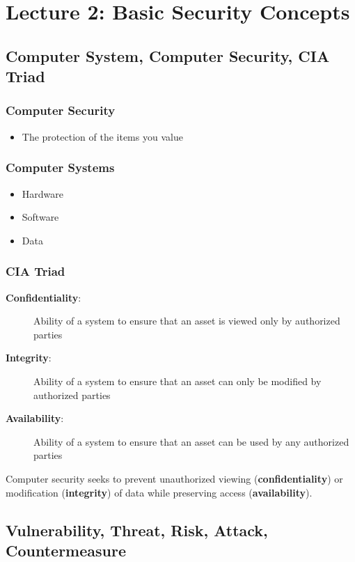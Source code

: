 \documentclass[11pt,a4paper]{article}
\begin{document}
\section{Lecture 2: Basic Security Concepts}

\subsection{Computer System, Computer Security, CIA Triad}

\subsubsection{Computer Security}
\begin{itemize}
    \item The protection of the items you value
\end{itemize}

\subsubsection{Computer Systems}
\begin{itemize}
    \item Hardware
    \item Software
    \item Data
\end{itemize}

\subsubsection{CIA Triad}
\begin{description}
    \item[\textbf{Confidentiality}:] Ability of a system to ensure that an asset is viewed only by authorized parties
    \item[\textbf{Integrity}:] Ability of a system to ensure that an asset can only be modified by authorized parties
    \item[\textbf{Availability}:] Ability of a system to ensure that an asset can be used by any authorized parties
\end{description}

Computer security seeks to prevent unauthorized viewing (\textbf{confidentiality}) or modification (\textbf{integrity}) of data while preserving access (\textbf{availability}).

\subsection{Vulnerability, Threat, Risk, Attack, Countermeasure}
\end{document}

